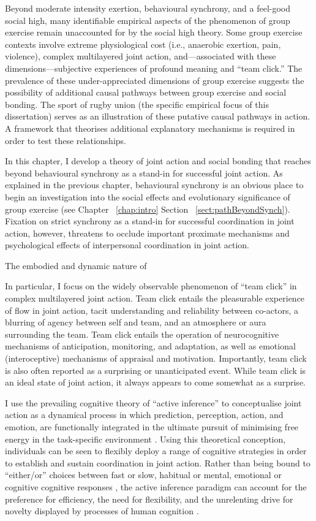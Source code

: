 \begin{CJK}{UTF8}{gbsn}
Beyond moderate intensity exertion, behavioural synchrony, and a feel-good social high, many identifiable empirical aspects of the phenomenon of group exercise remain unaccounted for by the social high theory.  Some group exercise contexts involve extreme physiological cost (i.e., anaerobic exertion, pain, violence), complex multilayered joint action, and---associated with these dimensions---subjective experiences of profound meaning and ``team click.''  The prevalence of these under-appreciated dimensions of group exercise suggests the possibility of additional causal pathways between group exercise and social bonding.  The sport of rugby union (the specific empirical focus of this dissertation) serves as an illustration of these putative causal pathways in action.  A framework that theorises additional explanatory mechanisms is required in order to test these relationships.

In this chapter, I develop a theory of joint action and social bonding that reaches beyond behavioural synchrony as a stand-in for successful joint action.  As explained in the previous chapter, behavioural synchrony is an obvious place to begin an investigation into the social effects and evolutionary significance of group exercise (see Chapter ~\ref{chap:intro} Section ~\ref{sect:pathBeyondSynch}). Fixation on strict synchrony as a stand-in for successful coordination in joint action, however, threatens to occlude important proximate mechanisms and psychological effects of interpersonal coordination in joint action.

The embodied and dynamic nature of

In particular, I focus on the widely observable phenomenon of ``team
click'' in complex multilayered joint action.  Team click entails the pleasurable experience of flow in joint action, tacit understanding and reliability between co-actors, a blurring of agency between self and team, and an atmosphere or aura surrounding the team.  Team click entails the operation of neurocognitive mechanisms of anticipation, monitoring, and adaptation, as well as emotional (interoceptive) mechanisms of appraisal and motivation.  Importantly, team click is also often reported as a surprising or unanticipated event. While team click is an ideal state of joint action, it always appears to come somewhat as a surprise.

I use the prevailing cognitive theory of ``active inference'' \citep{Friston2010} to conceptualise joint action as a dynamical process in which prediction, perception, action, and emotion, are functionally integrated in the ultimate pursuit of minimising free energy in the task-specific environment \citep{Clark2015}.  Using this theoretical conception, individuals can be seen to flexibly deploy a range of cognitive strategies in order to establish and sustain coordination in joint action.  Rather than being bound to ``either/or'' choices between fast or slow, habitual or mental, emotional or cognitive cognitive responses \citep[cf.][]{Kahneman2011}, the active inference paradigm can account for the preference for efficiency, the need for flexibility, and the unrelenting drive for novelty displayed by processes of human cognition \citep{Friston2011}.


\end{CJK}
